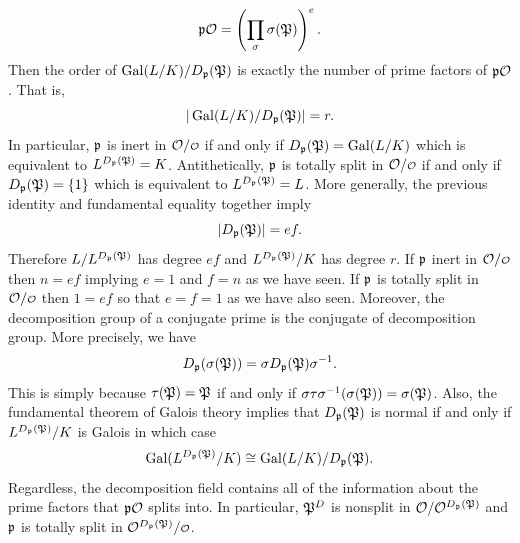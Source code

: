     \[
      \mathfrak{p}\mathcal{O} = \left(\prod_{\sigma}\sigma(\mathfrak{P})\right)^{e}.
    \]
    Then the order of \(\operatorname{\mathrm{Gal}}(L/K)/D_{\mathfrak{p}}(\mathfrak{P})\) is exactly the number of prime factors of \(\mathfrak{p}\mathcal{O}\). That is,
    \[
      |\operatorname{\mathrm{Gal}}(L/K)/D_{\mathfrak{p}}(\mathfrak{P})| = r.
    \]
    In particular, \(\mathfrak{p}\) is inert in \(\mc{O}/\smc{O}\) if and only if \(D_{\mathfrak{p}}(\mathfrak{P}) = \operatorname{\mathrm{Gal}}(L/K)\) which is equivalent to \(L^{D_{\mathfrak{p}}(\mathfrak{P})} = K\). Antithetically, \(\mathfrak{p}\) is totally split in \(\mc{O}/\smc{O}\) if and only if \(D_{\mathfrak{p}}(\mathfrak{P}) = \{1\}\) which is equivalent to \(L^{D_{\mathfrak{p}}(\mathfrak{P})} = L\). More generally, the previous identity and fundamental equality together imply
    \begin{equation}\label{equ:decomposition_group_e_f_relation}
      |D_{\mathfrak{p}}(\mathfrak{P})| = ef.
    \end{equation}
    Therefore \(L/L^{D_{\mathfrak{p}}(\mathfrak{P})}\) has degree \(ef\) and \(L^{D_{\mathfrak{p}}(\mathfrak{P})}/K\) has degree \(r\). If \(\mathfrak{p}\) inert in \(\mc{O}/\smc{O}\) then \(n = ef\) implying \(e = 1\) and \(f = n\) as we have seen. If \(\mathfrak{p}\) is totally split in \(\mc{O}/\smc{O}\) then \(1 = ef\) so that \(e = f = 1\) as we have also seen. Moreover, the decomposition group of a conjugate prime is the conjugate of decomposition group. More precisely, we have
    \[
      D_{\mathfrak{p}}(\sigma(\mathfrak{P})) = \sigma D_{\mathfrak{p}}(\mathfrak{P})\sigma^{-1}.
    \]
    This is simply because \(\tau(\mathfrak{P}) = \mathfrak{P}\) if and only if \(\sigma\tau\sigma^{-1}(\sigma(\mathfrak{P})) = \sigma(\mathfrak{P})\). Also, the fundamental theorem of Galois theory implies that \(D_{\mathfrak{p}}(\mathfrak{P})\) is normal if and only if \(L^{D_{\mathfrak{p}}(\mathfrak{P})}/K\) is Galois in which case
    \[
      \operatorname{\mathrm{Gal}}(L^{D_{\mathfrak{p}}(\mathfrak{P})}/K) \cong \operatorname{\mathrm{Gal}}(L/K)/D_{\mathfrak{p}}(\mathfrak{P}).
    \]
    Regardless, the decomposition field contains all of the information about the prime factors that \(\mathfrak{p}\mathcal{O}\) splits into. In particular, \(\mathfrak{P}^{D}\) is nonsplit in \(\mathcal{O}/\mathcal{O}^{D_{\mathfrak{p}}(\mathfrak{P})}\) and \(\mathfrak{p}\) is totally split in \(\mc{O}^{D_{\mf{p}}(\mf{P})}/\smc{O}\).

